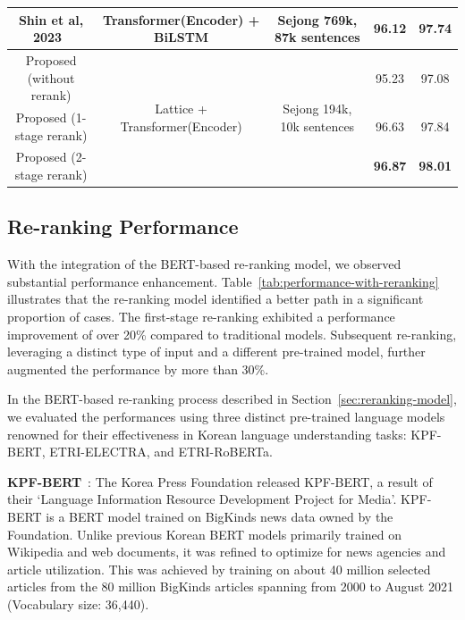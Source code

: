 \documentclass[AMS,STIX2COL]{WileyNJD-v2}
\begin{document}
\begin{table}[ht]
\begin{tabular*}{500pt}{@{\extracolsep\fill}ccc|cc@{\extracolsep\fill}}
            Shin et al, 2023~\cite{ShinHJ2023}    & Transformer(Encoder) + BiLSTM                   & Sejong 769k, 87k sentences                  & 96.12                      & 97.74                        \\
            \midrule
            Proposed (without rerank)             & \multirow{3}{*}{Lattice + Transformer(Encoder)} & \multirow{3}{*}{Sejong 194k, 10k sentences} & 95.23                      & 97.08                        \\
            Proposed (1-stage rerank)             & ~                                               & ~                                           & 96.63                      & 97.84                        \\
            Proposed (2-stage rerank)             & ~                                               & ~                                           & \textbf{96.87}             & \textbf{98.01}               \\
            \bottomrule
        \end{tabular*}
    \end{table}

    \subsection{Re-ranking Performance}\label{subsec:reranking-performance}

    With the integration of the BERT-based re-ranking model, we observed substantial performance enhancement.
    Table~\ref{tab:performance-with-reranking} illustrates that the re-ranking model identified a better path in a significant proportion of cases.
    The first-stage re-ranking exhibited a performance improvement of over 20\% compared to traditional models.
    Subsequent re-ranking, leveraging a distinct type of input and a different pre-trained model, further augmented the performance by more than 30\%.

    In the BERT-based re-ranking process described in Section~\ref{sec:reranking-model}, we evaluated the performances using three distinct pre-trained language models renowned for their effectiveness in Korean language understanding tasks: KPF-BERT, ETRI-ELECTRA, and ETRI-RoBERTa.

    \textbf{KPF-BERT}~\cite{KPF_BERT}: The Korea Press Foundation released KPF-BERT, a result of their `Language Information Resource Development Project for Media'.
    KPF-BERT is a BERT model trained on BigKinds news data owned by the Foundation.
    Unlike previous Korean BERT models primarily trained on Wikipedia and web documents, it was refined to optimize for news agencies and article utilization.
    This was achieved by training on about 40 million selected articles from the 80 million BigKinds articles spanning from 2000 to August 2021 (Vocabulary size: 36,440).
\end{document}
